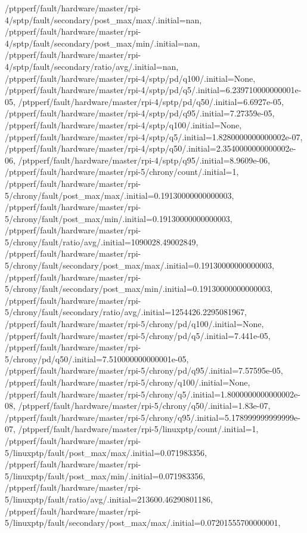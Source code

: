 {    /ptpperf/fault/hardware/master/rpi-4/sptp/fault/secondary/post_max/max/.initial=nan,
    /ptpperf/fault/hardware/master/rpi-4/sptp/fault/secondary/post_max/min/.initial=nan,
    /ptpperf/fault/hardware/master/rpi-4/sptp/fault/secondary/ratio/avg/.initial=nan,
    /ptpperf/fault/hardware/master/rpi-4/sptp/pd/q100/.initial=None,
    /ptpperf/fault/hardware/master/rpi-4/sptp/pd/q5/.initial=6.239710000000001e-05,
    /ptpperf/fault/hardware/master/rpi-4/sptp/pd/q50/.initial=6.6927e-05,
    /ptpperf/fault/hardware/master/rpi-4/sptp/pd/q95/.initial=7.27359e-05,
    /ptpperf/fault/hardware/master/rpi-4/sptp/q100/.initial=None,
    /ptpperf/fault/hardware/master/rpi-4/sptp/q5/.initial=1.8280000000000002e-07,
    /ptpperf/fault/hardware/master/rpi-4/sptp/q50/.initial=2.3540000000000002e-06,
    /ptpperf/fault/hardware/master/rpi-4/sptp/q95/.initial=8.9609e-06,
    /ptpperf/fault/hardware/master/rpi-5/chrony/count/.initial=1,
    /ptpperf/fault/hardware/master/rpi-5/chrony/fault/post_max/max/.initial=0.19130000000000003,
    /ptpperf/fault/hardware/master/rpi-5/chrony/fault/post_max/min/.initial=0.19130000000000003,
    /ptpperf/fault/hardware/master/rpi-5/chrony/fault/ratio/avg/.initial=1090028.49002849,
    /ptpperf/fault/hardware/master/rpi-5/chrony/fault/secondary/post_max/max/.initial=0.19130000000000003,
    /ptpperf/fault/hardware/master/rpi-5/chrony/fault/secondary/post_max/min/.initial=0.19130000000000003,
    /ptpperf/fault/hardware/master/rpi-5/chrony/fault/secondary/ratio/avg/.initial=1254426.2295081967,
    /ptpperf/fault/hardware/master/rpi-5/chrony/pd/q100/.initial=None,
    /ptpperf/fault/hardware/master/rpi-5/chrony/pd/q5/.initial=7.441e-05,
    /ptpperf/fault/hardware/master/rpi-5/chrony/pd/q50/.initial=7.510000000000001e-05,
    /ptpperf/fault/hardware/master/rpi-5/chrony/pd/q95/.initial=7.57595e-05,
    /ptpperf/fault/hardware/master/rpi-5/chrony/q100/.initial=None,
    /ptpperf/fault/hardware/master/rpi-5/chrony/q5/.initial=1.8000000000000002e-08,
    /ptpperf/fault/hardware/master/rpi-5/chrony/q50/.initial=1.83e-07,
    /ptpperf/fault/hardware/master/rpi-5/chrony/q95/.initial=5.178999999999999e-07,
    /ptpperf/fault/hardware/master/rpi-5/linuxptp/count/.initial=1,
    /ptpperf/fault/hardware/master/rpi-5/linuxptp/fault/post_max/max/.initial=0.071983356,
    /ptpperf/fault/hardware/master/rpi-5/linuxptp/fault/post_max/min/.initial=0.071983356,
    /ptpperf/fault/hardware/master/rpi-5/linuxptp/fault/ratio/avg/.initial=213600.46290801186,
    /ptpperf/fault/hardware/master/rpi-5/linuxptp/fault/secondary/post_max/max/.initial=0.07201555700000001,
}
